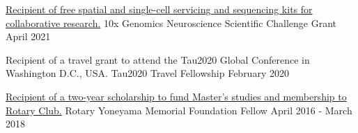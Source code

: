 %
%
%


\vspace*{0.5cm}

\begin{cventries}
    \cventry
        {\textnormal{\href{https://www.10xgenomics.com/blog/advancing-neuroscience-with-multidimensional-investigations}{Recipient of free spatial and single-cell servicing and sequencing kits for collaborative research.}}}
        {10x Genomics Neuroscience Scientific Challenge Grant}
        {April 2021}
        {}
        {}

    \vspace*{-0.1cm}

    \cventry
        {\textnormal{Recipient of a travel grant to attend the Tau2020 Global Conference in Washington D.C., USA.}}
        {Tau2020 Travel Fellowship}
        {February 2020}
        {}
        {}

    \vspace*{-0.1cm}

    \cventry
        {\textnormal{\href{https://hiroorc.org/event/20180215-2/}{Recipient of a two-year scholarship to fund Master's studies and membership to Rotary Club.}}}
        {Rotary Yoneyama Memorial Foundation Fellow}
        {April 2016 - March 2018}
        {}
        {}

\end{cventries}

\vspace*{-0.65cm}
